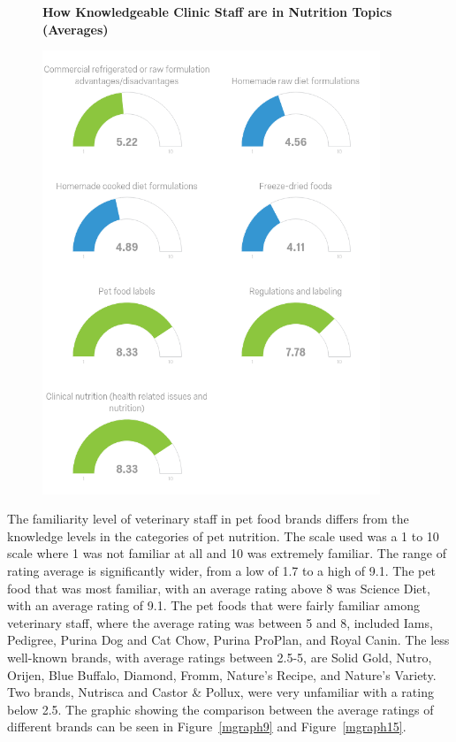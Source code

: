     \begin{figure}[htbp] 
    \centering
    \textbf{How Knowledgeable Clinic Staff are in Nutrition Topics (Averages)}\par\medskip
    \includegraphics[width=0.9\textwidth]{Images/nkcs2.png}
    \label{mgraph14}
    \end{figure}
\par The familiarity level of veterinary staff in pet food brands differs from the knowledge levels in the categories of pet nutrition. The scale used was a 1 to 10 scale where 1 was not familiar at all and 10 was extremely familiar. The range of rating average is significantly wider, from a low of 1.7 to a high of 9.1. The pet food that was most familiar, with an average rating above 8 was Science Diet, with an average rating of 9.1. The pet foods that were fairly familiar among veterinary staff, where the average rating was between 5 and 8, included Iams, Pedigree, Purina Dog and Cat Chow, Purina ProPlan, and Royal Canin. The less well-known brands, with average ratings between 2.5-5, are Solid Gold, Nutro, Orijen, Blue Buffalo, Diamond, Fromm, Nature's Recipe, and Nature's Variety. Two brands, Nutrisca and Castor \& Pollux, were very unfamiliar with a rating below 2.5. The graphic showing the comparison between the average ratings of different brands can be seen in Figure~\ref{mgraph9} and Figure~\ref{mgraph15}.
